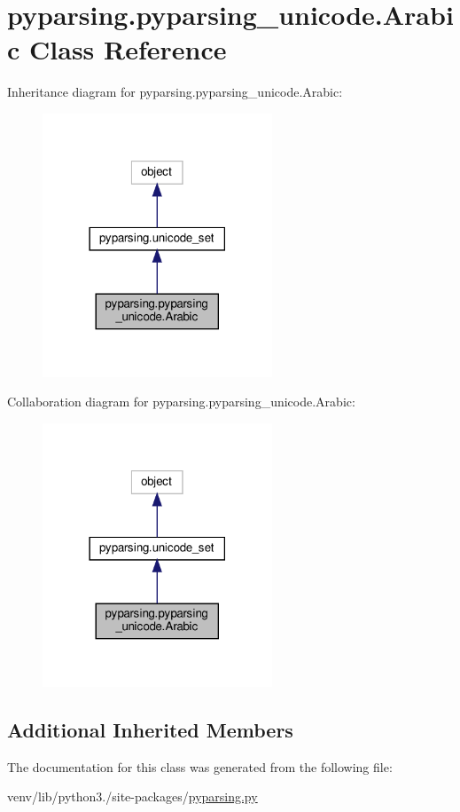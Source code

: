 \hypertarget{classpyparsing_1_1pyparsing__unicode_1_1Arabic}{}\section{pyparsing.\+pyparsing\+\_\+unicode.\+Arabic Class Reference}
\label{classpyparsing_1_1pyparsing__unicode_1_1Arabic}


Inheritance diagram for pyparsing.\+pyparsing\+\_\+unicode.\+Arabic\+:
\nopagebreak
\begin{figure}[H]
\begin{center}
\leavevmode
\includegraphics[width=194pt]{classpyparsing_1_1pyparsing__unicode_1_1Arabic__inherit__graph}
\end{center}
\end{figure}


Collaboration diagram for pyparsing.\+pyparsing\+\_\+unicode.\+Arabic\+:
\nopagebreak
\begin{figure}[H]
\begin{center}
\leavevmode
\includegraphics[width=194pt]{classpyparsing_1_1pyparsing__unicode_1_1Arabic__coll__graph}
\end{center}
\end{figure}
\subsection*{Additional Inherited Members}


The documentation for this class was generated from the following file\+:\begin{DoxyCompactItemize}
\item 
venv/lib/python3./site-\/packages/\hyperlink{pyparsing_8py}{pyparsing.\+py}\end{DoxyCompactItemize}

